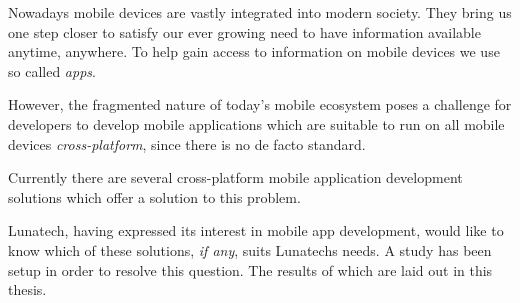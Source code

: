\samenvatting



Nowadays mobile devices are vastly integrated into modern society. They bring us one step closer to satisfy our ever growing need to have information available anytime, anywhere. To help gain access to information on mobile devices we use so called \emph{apps}. 

However, the fragmented nature of today's mobile ecosystem poses a challenge for developers to develop mobile applications which are suitable to run on all mobile devices \emph{cross-platform}, since there is no de facto standard.

Currently there are several cross-platform mobile application development solutions which offer a solution to this problem. 

Lunatech, having expressed its interest in mobile app development, would like to know which of these solutions, \emph{if any}, suits Lunatechs needs. A study has been setup in order to resolve this question. The results of which are laid out in this thesis.